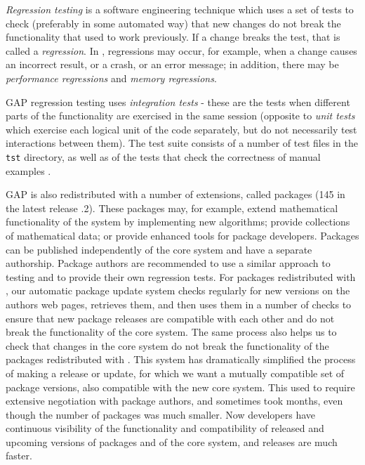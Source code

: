 \documentclass{deliverablereport}
\begin{document}
\emph{Regression testing} is a software engineering technique which uses
a set of tests to check (preferably in some automated way)
that new changes do not break the functionality that used to 
work previously. If a change breaks the test, that is called 
a \emph{regression}. In \GAP, regressions may occur, for example,
when a change causes an incorrect result, or a crash, or an error
message; in addition, there may be \emph{performance regressions}
and \emph{memory regressions}.

GAP regression testing uses \emph{integration tests} - these are
the tests when different parts of the \GAP functionality are 
exercised in the same \GAP session (opposite to \emph{unit tests}
which exercise each logical unit of the code separately, but do
not necessarily test interactions between them).
The \GAP test
suite consists of a number  of test files in the
{\tt tst} directory,  
as well as of the tests that check the correctness of manual examples
.

GAP is also redistributed with a number of extensions, called \GAP packages
(145 in the latest release .2). These packages may, for example,
extend mathematical functionality of the system by implementing new algorithms;
provide collections of mathematical data; or provide enhanced tools for 
package developers. Packages can be published independently of the core \GAP
system and have a separate authorship. Package authors are recommended to 
use a similar approach to testing and to provide their own regression tests.
For packages redistributed with \GAP, our automatic package update system
checks regularly for new versions on the authors web pages, retrieves them, and then uses them in a
number of checks to ensure that new package releases are compatible with
each other and do not break the functionality of the core \GAP system. The
same process also helps us to check that changes in the core \GAP system
do not break the functionality of the packages redistributed with \GAP
. This system has dramatically simplified the process of making a \GAP
release or update, for which we want a mutually compatible set of
package versions, also compatible with the new core system. This used
to require extensive negotiation with package authors, and sometimes
took months, even though the number of packages was much smaller. Now
developers have continuous visibility of the functionality and
compatibility of released and upcoming versions of packages and of the
core system, and releases are much faster.
\end{document}
